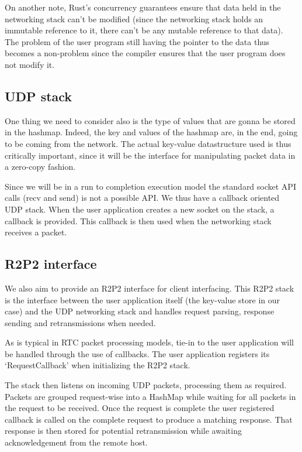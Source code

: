 \documentclass[11pt]{article}
\begin{document}
On another note, Rust's concurrency guarantees ensure that data held
in the networking stack can't be modified (since the networking stack
holds an immutable reference to it, there can't be any mutable
reference to that data). The problem of the user program still having
the pointer to the data thus becomes a non-problem since the compiler
ensures that the user program does not modify it.

\subsection{UDP stack}

One thing we need to consider also is the type of values that are
gonna be stored in the hashmap. Indeed, the key and values of the
hashmap are, in the end, going to be coming from the network. The
actual key-value datastructure used is thus critically important,
since it will be the interface for manipulating packet data in a
zero-copy fashion.

Since we will be in a run to completion execution model the standard
socket API calls (recv and send) is not a possible API. We thus have a
callback oriented UDP stack. When the user application creates a
new socket on the stack, a callback is provided. This callback is then
used when the networking stack receives a packet.

\subsection{R2P2 interface}

We also aim to provide an R2P2 interface for client interfacing. This
R2P2 stack is the interface between the user application itself (the
key-value store in our case) and the UDP networking stack and handles
request parsing, response sending and retransmissions when needed.

As is typical in RTC packet processing models, tie-in to the user
application will be handled through the use of callbacks. The user
application registers its `RequestCallback' when initializing the R2P2
stack.

The stack then listens on incoming UDP packets, processing them as
required. Packets are grouped request-wise into a HashMap while
waiting for all packets in the request to be received. Once the
request is complete the user registered callback is called on the
complete request to produce a matching response. That response is then
stored for potential retransmission while awaiting acknowledgement
from the remote host.
\end{document}
